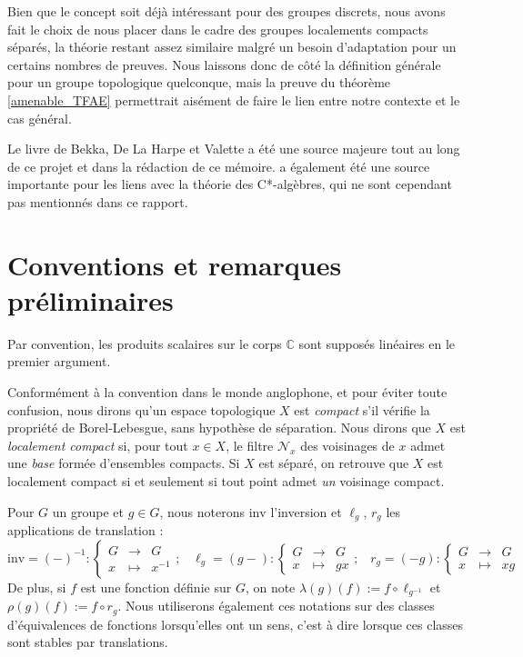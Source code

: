 \documentclass[a4paper,12pt]{article}
\newcommand{\C}{\mathbb{C}}
\newcommand\fundef[3]{#1: \left\{\begin{array}{ccc}#2\\#3\end{array}\right.}
\newcommand{\ssi}{si et seulement si }
\newcommand{\inv}{^{-1}}
\newcommand{\comp}{\circ}
\newcommand{\nhds}{\mathcal{N}}
\newcommand{\blank}{{-}}
\newcommand{\invop}{\mathrm{inv}}
\begin{document}
Bien que le concept soit déjà intéressant pour des groupes discrets, nous avons fait le choix de nous placer 
dans le cadre des groupes localements compacts séparés, la théorie restant assez similaire malgré un besoin
d'adaptation pour un certains nombres de preuves. Nous laissons donc de côté la définition générale 
pour un groupe topologique quelconque, mais la preuve du théorème \ref{amenable_TFAE} permettrait 
aisément de faire le lien entre notre contexte et le cas général.

Le livre \cite{bekka_de_la_harpe_valette_2008} de Bekka, De La Harpe et Valette a été une source majeure tout 
au long de ce projet et dans la rédaction de ce mémoire. \cite{dixmier1982c} a également été une source importante 
pour les liens avec la théorie des C*-algèbres, qui ne sont cependant pas mentionnés dans ce rapport.

\clearpage

\section*{Conventions et remarques préliminaires}

Par convention, les produits scalaires sur le corps $\C$ sont supposés linéaires en le premier argument.

Conformément à la convention dans le monde anglophone, et pour éviter toute confusion, nous dirons qu'un espace topologique
$X$ est \emph{compact} s'il vérifie la propriété de Borel-Lebesgue, sans hypothèse de séparation. 
Nous dirons que $X$ est \emph{localement compact} si, pour tout $x\in X$, le filtre $\nhds_x$ des voisinages de $x$ admet
une \emph{base} formée d'ensembles compacts. Si $X$ est séparé, on retrouve que $X$ est localement compact 
\ssi tout point admet \emph{un} voisinage compact. 

Pour $G$ un groupe et $g\in G$, nous noterons $\invop$ l'inversion et $\ell_g$, $r_g$ les applications de translation :
\begin{equation*}
    \fundef{\invop = (\blank)\inv}{G&\to& G}{x&\mapsto& x\inv}\text{;}\quad\fundef{\ell_g=(g\blank)}{G&\to& G}{x&\mapsto& gx}\text{;}\quad\fundef{r_g=(\blank g)}{G&\to& G}{x&\mapsto& xg}
\end{equation*}
De plus, si $f$ est une fonction définie sur $G$, on note $\lambda(g)(f) := f\comp\ell_{g\inv}$
et $\rho(g)(f) := f\comp r_g$. Nous utiliserons également ces notations sur des classes d'équivalences de fonctions 
lorsqu'elles ont un sens, c'est à dire lorsque ces classes sont stables par translations.
\end{document}
